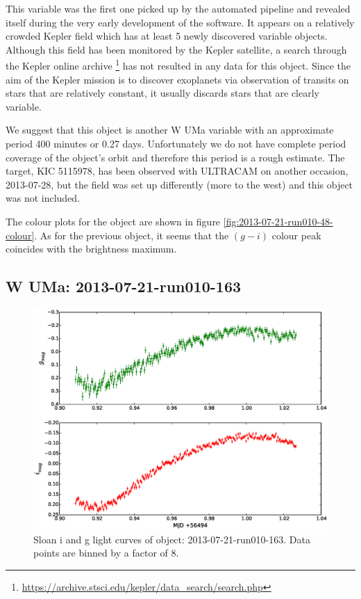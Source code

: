  
This variable was the first one picked up by the automated pipeline and revealed itself during the very early development of the software. It appears on a relatively crowded Kepler field which has at least 5 newly discovered variable objects. Although this field has been monitored by the Kepler satellite, a search through the Kepler online archive \footnote{\url{https://archive.stsci.edu/kepler/data_search/search.php}} has not resulted in any data for this object. Since the aim of the Kepler mission is to discover exoplanets via observation of transits on stars that are relatively constant, it usually discards stars that are clearly variable. 

We suggest that this object is another {W UMa} variable with an approximate period 400 minutes or 0.27 days. Unfortunately we do not have complete period coverage of the object's orbit and therefore this period is a rough estimate. The target, KIC 5115978, has been observed with ULTRACAM on another occasion, 2013-07-28, but the field was set up differently (more to the west) and this object was not included. 

The colour plots for the object are shown in figure \ref{fig:2013-07-21-run010-48-colour}. As for the previous object, it seems that the $(g-i)$ colour peak coincides with the brightness maximum.

\subsection{{W UMa}: 2013-07-21-run010-163}

\begin{figure}
  \center
  \includegraphics[width=120mm]{images/2013-07-21-run010-163_lightcurve-bin8.eps}
  \caption{Sloan i and g light curves of object: 2013-07-21-run010-163. Data points are binned by a factor of 8.}
  \label{fig:2013-07-21-run010-163}
\end{figure}

